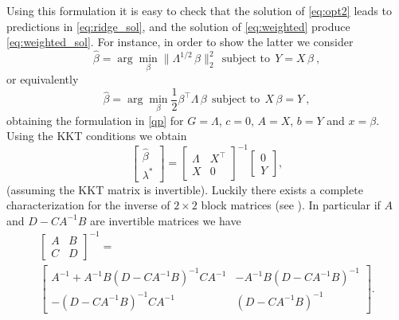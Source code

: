 \documentclass[12pt,letterpaper]{article}
\begin{document}
Using this formulation it is easy to check that the solution of \eqref{eq:opt2} leads to predictions in \eqref{eq:ridge_sol}, and the solution of \eqref{eq:weighted} produce \eqref{eq:weighted_sol}. For instance, in order to show the latter we consider 
\begin{equation} \label{eq:weighted_app}
    \hat{\beta} = \arg\min_\beta \|\Lambda^{1/2}\,\beta\|_2^2 ~~\mbox{subject to}~~ Y = X\,\beta
    ~,
\end{equation}
or equivalently 
\begin{equation}
    \hat{\beta} = \arg\min_\beta \frac{1}{2}\beta^\top \Lambda\,\beta ~~\mbox{subject to}~~  X\,\beta = Y
    ~,
\end{equation}
obtaining the formulation in \eqref{qp} for $G=\Lambda$, $c=0$, $A=X$, $b=Y$ and $x=\beta$. Using the KKT conditions we obtain
\begin{equation}
    \left[
    \begin{matrix}
    \hat \beta \\ 
    \lambda^*
    \end{matrix}\right] =
    \left[
    \begin{matrix}
    \Lambda & X^\top \\ 
    X & 0
    \end{matrix}\right]^{-1}
    \left[
    \begin{matrix}
    0 \\ 
    Y
    \end{matrix}\right],
    \label{kkt2}
\end{equation}
(assuming the KKT matrix is invertible). Luckily there exists a complete characterization for the inverse of $2\times 2$ block matrices (see \cite{lu2002inverses}). In particular if $A$ and $D - CA^{-1}B$ are invertible matrices we have
\begin{multline} 
 {\begin{bmatrix}  {A} &   {B} \\  {C} &  {D} \end{bmatrix}}^{-1}= \\ {\begin{bmatrix}  {A} ^{-1}+  {A} ^{-1}  {B} \left(  {D} -  {CA} ^{-1}  {B} \right)^{-1}  {CA} ^{-1}& -  {A} ^{-1}  {B} \left(  {D} -  {CA} ^{-1}  {B} \right)^{-1}\\-\left(  {D} -  {CA} ^{-1}  {B} \right)^{-1}  {CA} ^{-1}& \left(  {D} -  {CA} ^{-1}  {B} \right)^{-1}\end{bmatrix}}.
\end{multline}
\end{document}

